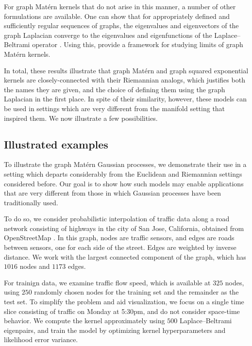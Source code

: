 \documentclass[11pt]{book}
\begin{document}
For graph Matérn kernels that do not arise in this manner, a number of other formulations are available.
One can show that for appropriately defined and sufficiently regular sequences of graphs, the eigenvalues and eigenvectors of the graph Laplacian converge to the eigenvalues and eigenfunctions of the Laplace--Beltrami operator \cite{belkin07,burago14}.
Using this, \textcite{sanzalonso20} provide a framework for studying limits of graph Matérn kernels.

In total, these results illustrate that graph Matérn and graph squared exponential kernels are closely-connected with their Riemannian analogs, which justifies both the names they are given, and the choice of defining them using the graph Laplacian in the first place.
In spite of their similarity, however, these models can be used in settings which are very different from the manifold setting that inspired them.
We now illustrate a few possibilities.

\subsection{Illustrated examples}

To illustrate the graph Matérn Gaussian processes, we demonstrate their use in a setting which departs considerably from the Euclidean and Riemannian settings considered before.
Our goal is to show how such models may enable applications that are very different from those in which Gaussian processes have been traditionally used.

To do so, we consider probabilistic interpolation of traffic data along a road network consisting of highways in the city of San Jose, California, obtained from OpenStreetMap \cite{osm17}.
In this graph, nodes are traffic sensors, and edges are roads between sensors, one for each side of the street.
Edges are weighted by inverse distance.
We work with the largest connected component of the graph, which has $1016$ nodes and $1173$ edges.

For trainign data, we examine traffic flow speed, which is available at $325$ nodes, using $250$ randomly chosen nodes for the training set and the remainder as the test set.
To simplify the problem and aid visualization, we focus on a single time slice consisting of traffic on Monday at 5:30pm, and do not consider space-time behavior.
We compute the kernel approximately using $500$ Laplace--Beltrami eigenpairs, and train the model by optimizing kernel hyperparameters and likelihood error variance.
\end{document}
